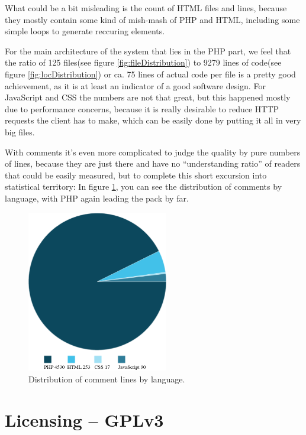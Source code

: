What could be a bit misleading is the count of HTML files and lines, because they mostly contain some kind of mish-mash of PHP and HTML, including some simple loops to generate reccuring elements.

For the main architecture of the system that lies in the PHP part, we feel that the ratio of 125 files(see figure \ref{fig:fileDistribution}) to 9279 lines of code(see figure \ref{fig:locDistribution}) or ca. 75 lines of actual code per file is a pretty good achievement, as it is at least an indicator of a good software design. For JavaScript and CSS the numbers 
are not that great, but this happened mostly due to performance concerns, because it is 
really desirable to reduce HTTP requests the client has to make, which can be easily done by putting it all in very big files.

With comments it's even more complicated to judge the quality by pure numbers of lines,
because they are just there and have no \enquote{understanding ratio} of readers that could be easily measured, but to complete this short excursion into statistical territory: In figure \ref{fig:commentDistribution}, you can see the distribution of comments by language, with PHP again leading the pack by far.

\begin{figure}[!h]
  \centering
    \includegraphics[width=0.55\textwidth]{images/comments.png}
  \caption{Distribution of comment lines by language.}
  \label{fig:commentDistribution}
\end{figure}

\section{Licensing -- GPLv3}

